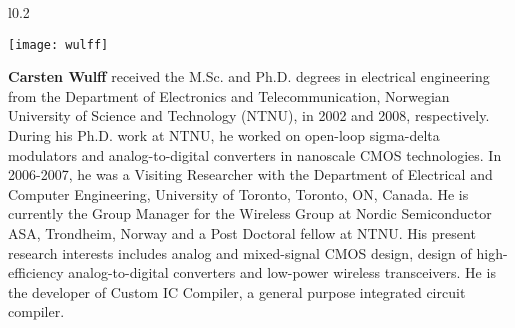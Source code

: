 

\begin{wrapfigure}{l}{0.2\textwidth}
\centerline{\texttt{[image: wulff]} }
\end{wrapfigure}

 \textbf{Carsten Wulff}
received the M.Sc. and Ph.D. degrees in
electrical engineering from the Department of Electronics and Telecommunication, Norwegian University of Science and Technology (NTNU),
in 2002 and 2008, respectively.
During his Ph.D. work at NTNU, he worked on open-loop sigma-delta
modulators and analog-to-digital converters in nanoscale CMOS
technologies. In 2006-2007, he was a Visiting Researcher with the
Department of Electrical and Computer Engineering, University of
Toronto, Toronto, ON, Canada. He is currently the Group Manager for the
Wireless Group at Nordic Semiconductor ASA, Trondheim, Norway and a
Post Doctoral fellow at NTNU. His
present research interests includes analog and mixed-signal CMOS
design, design of high-efficiency analog-to-digital converters and
low-power wireless transceivers. He is the developer of Custom IC
Compiler, a general purpose integrated circuit compiler.
